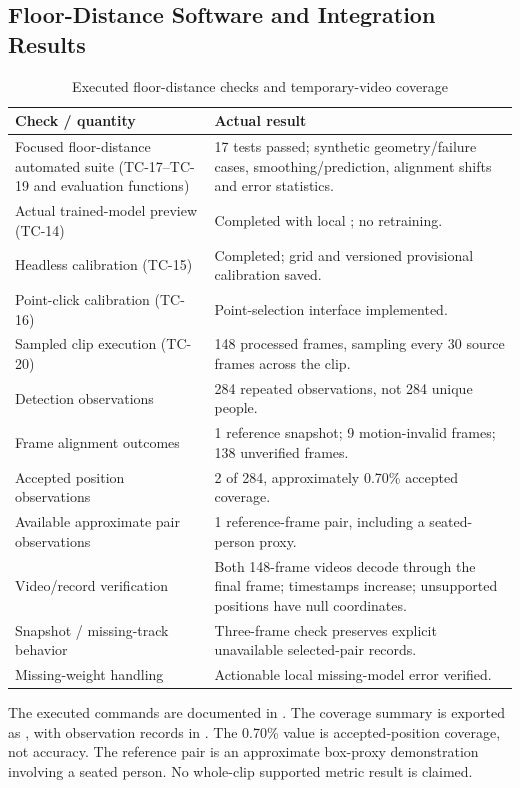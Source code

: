 \subsection{Floor-Distance Software and Integration Results}
\begin{longtable}{P{0.42\textwidth}P{0.44\textwidth}}
\caption{Executed floor-distance checks and temporary-video coverage}\label{tab:floor-results}\\
\toprule
Check / quantity & Actual result\\
\midrule
\endhead
Focused floor-distance automated suite (TC-17--TC-19 and evaluation functions) & 17 tests passed; synthetic geometry/failure cases, smoothing/prediction, alignment shifts and error statistics.\\
Actual trained-model preview (TC-14) & Completed with local ; no retraining.\\
Headless calibration (TC-15) & Completed; grid and versioned provisional calibration saved.\\
Point-click calibration (TC-16) & Point-selection interface implemented.\\
Sampled clip execution (TC-20) & 148 processed frames, sampling every 30 source frames across the clip.\\
Detection observations & 284 repeated observations, not 284 unique people.\\
Frame alignment outcomes & 1 reference snapshot; 9 motion-invalid frames; 138 unverified frames.\\
Accepted position observations & 2 of 284, approximately 0.70\% accepted coverage.\\
Available approximate pair observations & 1 reference-frame pair, including a seated-person proxy.\\
Video/record verification & Both 148-frame videos decode through the final frame; timestamps increase; unsupported positions have null coordinates.\\
Snapshot / missing-track behavior & Three-frame check preserves explicit unavailable selected-pair records.\\
Missing-weight handling & Actionable local missing-model error verified.\\
\bottomrule
\end{longtable}
The executed commands are documented in . The coverage summary is exported as , with observation records in . The 0.70\% value is accepted-position coverage, not accuracy. The reference pair is an approximate box-proxy demonstration involving a seated person. No whole-clip supported metric result is claimed.

